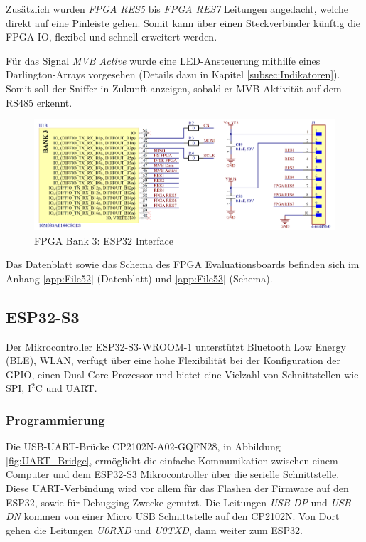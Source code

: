 Zusätzlich wurden \textit{FPGA RES5} bis \textit{FPGA RES7} Leitungen angedacht, welche direkt auf eine Pinleiste gehen. Somit kann über einen Steckverbinder künftig die FPGA IO, flexibel und schnell erweitert werden.

Für das Signal \textit{MVB Active} wurde eine LED-Ansteuerung mithilfe eines Darlington-Arrays vorgesehen (Details dazu in Kapitel \ref{subsec:Indikatoren}). Somit soll der Sniffer in Zukunft anzeigen, sobald er MVB Aktivität auf dem RS485 erkennt.

\begin{figure}[H]
    \centering
    \includegraphics[width=1.0\linewidth]{Figures/Chap3/Schematics/Bank3_ESP.png}
    \caption{FPGA Bank 3: ESP32 Interface}
    \label{FPGA ESP}
\end{figure}

Das Datenblatt sowie das Schema des FPGA Evaluationsboards befinden sich im Anhang \ref{app:File52} (Datenblatt) und \ref{app:File53} (Schema).

\subsection{ESP32-S3}
Der Mikrocontroller ESP32-S3-WROOM-1 unterstützt Bluetooth Low Energy (BLE), WLAN, verfügt über eine hohe Flexibilität bei der Konfiguration der GPIO, einen Dual-Core-Prozessor und bietet eine Vielzahl von Schnittstellen wie SPI, I$^2$C und UART.

\subsubsection{Programmierung}
Die USB-UART-Brücke CP2102N-A02-GQFN28, in Abbildung \ref{fig:UART_Bridge}, ermöglicht die einfache Kommunikation zwischen einem Computer und dem ESP32-S3 Mikrocontroller über die serielle Schnittstelle. Diese UART-Verbindung wird vor allem für das Flashen der Firmware auf den ESP32, sowie für Debugging-Zwecke genutzt. Die Leitungen \textit{USB DP} und \textit{USB DN} kommen von einer Micro USB Schnittstelle auf den CP2102N. Von Dort gehen die Leitungen \textit{U0RXD} und \textit{U0TXD}, dann weiter zum ESP32.

